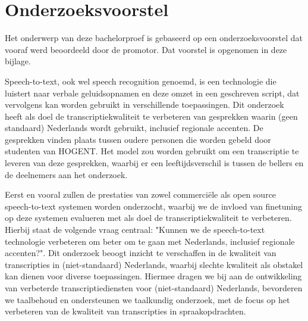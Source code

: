 \documentclass[dutch,dit,thesis]{hogentreport}
\begin{document}





%
%




\appendix

\chapter{Onderzoeksvoorstel}

Het onderwerp van deze bachelorproef is gebaseerd op een onderzoeksvoorstel dat vooraf werd beoordeeld door de promotor. Dat voorstel is opgenomen in deze bijlage.
\vspace{3pt}


Speech-to-text, ook wel speech recognition genoemd, is een technologie die luistert naar verbale geluidsopnamen en deze omzet in een geschreven script, dat vervolgens kan worden gebruikt in verschillende toepassingen. Dit onderzoek heeft als doel de transcriptiekwaliteit te verbeteren van gesprekken waarin (geen standaard) Nederlands wordt gebruikt, inclusief regionale accenten. De gesprekken vinden plaats tussen oudere personen die worden gebeld door studenten van HOGENT. Het model zou worden gebruikt om een transcriptie te leveren van deze gesprekken, waarbij er een leeftijdsverschil is tussen de bellers en de deelnemers aan het onderzoek.

Eerst en vooral zullen de prestaties van zowel commerciële als open source speech-to-text systemen worden onderzocht, waarbij we de invloed van finetuning op deze systemen evalueren met als doel de transcriptiekwaliteit te verbeteren. Hierbij staat de volgende vraag centraal: "Kunnen we de speech-to-text technologie verbeteren om beter om te gaan met Nederlands, inclusief regionale accenten?". Dit onderzoek beoogt inzicht te verschaffen in de kwaliteit van transcripties in (niet-standaard) Nederlands, waarbij slechte kwaliteit als obstakel kan dienen voor diverse toepassingen. Hiermee dragen we bij aan de ontwikkeling van verbeterde transcriptiediensten voor (niet-standaard) Nederlands, bevorderen we taalbehoud en ondersteunen we taalkundig onderzoek, met de focus op het verbeteren van de kwaliteit van transcripties in spraakopdrachten.
\end{document}
